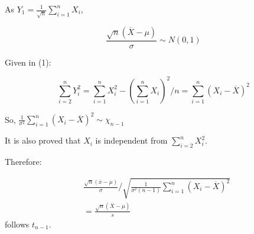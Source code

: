 \documentclass{article}
\begin{document}
As \(Y_1=\frac{1}{\sqrt{n}}\sum_{i=1}^nX_i\),

\begin{equation}
    \frac{\sqrt{n}(\overline{X}-\mu)}{\sigma}\sim N(0,1)
\end{equation}

Given in (1):

\begin{equation}
    \sum_{i=2}^nY_i^2=\sum_{i=1}^{n}X_i^2-(\sum_{i=1}^nX_i)^2/n
    =\sum_{i=1}^n(X_i-\overline{X})^2
\end{equation}

So, \(\frac{1}{\sigma^2}\sum_{i=1}^n(X_i-\overline{X})^2\sim \chi_{n-1}\)

\vspace{3mm}

It is also proved that \(X_i\) is independent from \(\sum_{i=2}^nX_i^2\).

Therefore:

\begin{equation}
\begin{split}
&\frac{\sqrt{n}(\overline{x}-\mu)}{\sigma}/
\sqrt{\frac{1}{\sigma^2(n-1)}\sum_{i=1}^n(X_i-\overline{X})^2}\\
&=\frac{\sqrt{n}(\overline{X}-\mu)}{s}
\end{split}
\end{equation}
follows \(t_{n-1}\).
\end{document}
